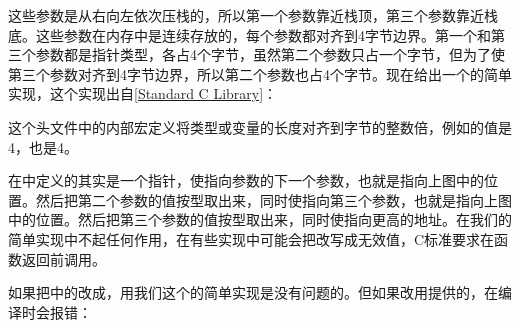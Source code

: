 


这些参数是从右向左依次压栈的，所以第一个参数靠近栈顶，第三个参数靠近栈底。这些参数在内存中是连续存放的，每个参数都对齐到4字节边界。第一个和第三个参数都是指针类型，各占4个字节，虽然第二个参数只占一个字节，但为了使第三个参数对齐到4字节边界，所以第二个参数也占4个字节。现在给出一个的简单实现，这个实现出自\hyperlink{db.bi01.bibli.standardclib}{[Standard C Library]}：





这个头文件中的内部宏定义将类型或变量的长度对齐到字节的整数倍，例如的值是4，也是4。



在中定义的其实是一个指针，使指向参数的下一个参数，也就是指向上图中的位置。然后把第二个参数的值按型取出来，同时使指向第三个参数，也就是指向上图中的位置。然后把第三个参数的值按型取出来，同时使指向更高的地址。在我们的简单实现中不起任何作用，在有些实现中可能会把改写成无效值，C标准要求在函数返回前调用。



如果把中的改成，用我们这个的简单实现是没有问题的。但如果改用提供的，在编译时会报错：


